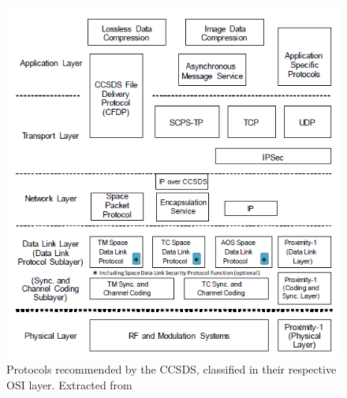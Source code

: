 \begin{figure}[H]
\begin{center}
\includegraphics[scale=0.6]{SpaceSegment/Layer3/CCSDSprotocols.png}
\caption[Protocols recommended by the CCSDS]{Protocols recommended by the CCSDS, classified in their respective OSI layer. Extracted from \cite{CCSDSOverview}}
\end{center}
\end{figure}
